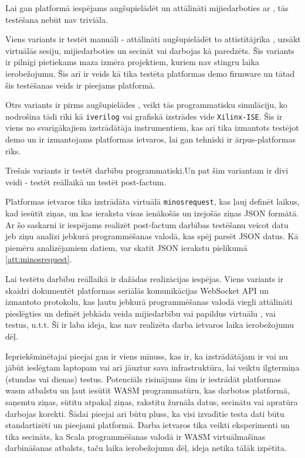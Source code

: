 Lai gan platformā iespējams augšupielādēt un attālināti mijiedarboties ar
, tās testēšana nebūt nav triviāla.

Viens variants ir testēt  manuāli -
attālināti augšupielādēt to attīstītājrīka , uzsākt
virtuālās  sesiju, mijiedarboties un secināt vai
 darbojas kā paredzēts. Šis variants ir pilnīgi
pietiekams maza izmēra projektiem, kuriem nav stingru laika ierobežojumu. Šis
arī ir veids kā tika testēta platformas demo \gls{firmware} un tātad šis
testēšanas veids ir pieejams platformā.

Otrs variants ir pirms  augšupielādes
, veikt tās programmatisku simulāciju, ko nodrošina
tādi rīki kā \lstinline!iverilog! vai grafiskā izstrādes vide
\lstinline!Xilinx-ISE!. Šis ir viens no svarīgākajiem izstrādātāja
instrumentiem, kas arī tika izmantots testējot demo
 un ir izmantojams platformas ietvaros, lai
gan tehniski ir ārpus-platformas rīks.

Trešais variants ir testēt  darbību
programmatiski.Un pat šim variantam ir divi veidi - testēt reāllaikā un testēt
post-factum. 

Platformas ietvaros tika izstrādāta virtuālā 
\lstinline!minosrequest!, kas ļauj definēt laikus, kad iesūtīt
 ziņas, un kas ieraksta visas ienākošās un
izejošās ziņas JSON formātā. Ar šo saskarni ir iespējams realizēt post-factum
darbības testēšanu veicot datu jeb ziņu analīzi jebkurā programmēšanas valodā,
kas spēj parsēt JSON datus. Kā piemēru analizējamiem datiem, var skatīt JSON
ierakstu pielikumā \ref{att:minosrequest}.

Lai testētu  darbību reāllaikā ir dažādas
realizācijas iespējas. Viens variants ir skaidri dokumentēt platformas seriālās
komunikācijas WebSocket API un izmantoto protokolu, kas ļautu jebkurā
programmēšanas valodā viegli attālināti pieslēgties 
un definēt jebkāda veida mijiedarbību vai papildus virtuālu
, vai testus, u.t.t. Šī ir laba ideja, kas nav
realizēta darba ietvaros laika ierobežojumu dēļ.

Iepriekšminētajai pieejai gan ir viens mīnuss, kas ir, ka izstrādātājam ir vai
nu jābūt ieslēgtam laptopam vai arī jāuztur sava infrastruktūra, lai veiktu
ilgtermiņa (stundas vai dienas) testus. Potenciāls risinājums šim ir iestrādāt
platformas  \gls{wasm} atbalstu un ļaut iesūtīt WASM
programmatūru, kas darbotos platformā, saņemtu ziņas, sūtītu atpakaļ ziņas,
rakstītu žurnāla datus, secinātu vai apratūra darbojas korekti. Šādai pieejai
arī būtu pluss, ka visi izvadītie testa dati būtu standartizēti un pieejami
platformā. Darba ietvaros tika veikti eksperimenti un tika secināts, ka Scala
programmēšanas valodā ir WASM virtuālmašīnas darbināšanas atbalsts, taču laika
ierobežojumu dēļ, ideja netika tālāk izpētīta.
